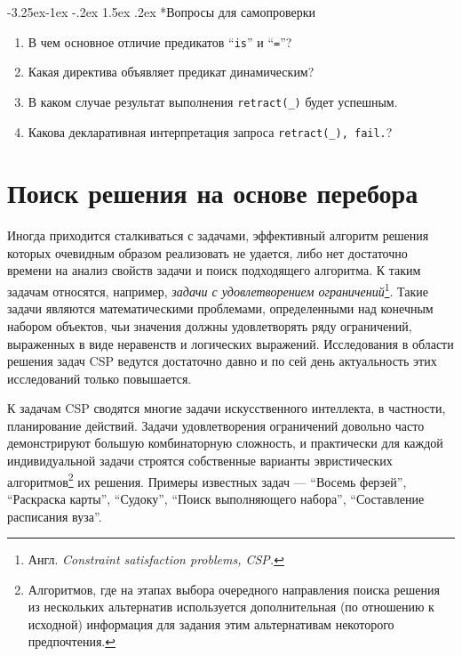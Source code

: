 \documentclass[12pt, openany, twoside]{book} %
\makeatletter
\renewcommand\subsubsection{\@startsection{subsubsection}{3}{\z@}%
                                     {-3.25ex\@plus -1ex \@minus -.2ex}%
                                     {1.5ex \@plus .2ex}%
                                     {\normalfont\normalsize\bfseries}}
\newenvironment{questions}{\subsubsection*{Вопросы для самопроверки}\begin{enumerate}}{\end{enumerate}}
\makeatother
\begin{document}
\begin{questions}
  \item{} В чем основное отличие предикатов ``\texttt{is}'' и ``\texttt{=}''?
  \item{} Какая директива объявляет предикат динамическим?
  \item{} В каком случае результат выполнения \texttt{retract(\_)} будет ус\-пеш\-ным.
  \item{} Какова декларативная интерпретация запроса \texttt{retract(\_), fail.}?
\end{questions}

\chapter{Поиск решения на основе перебора}

Иногда приходится сталкиваться с задачами, эффективный алгоритм решения которых очевидным образом реализовать не удается, либо нет достаточно времени на анализ свойств задачи и поиск подходящего алгоритма. К таким задачам относятся, например, \emph{задачи с удовлетворением ограничений}\footnote{Англ. \emph{Constraint satisfaction problems, CSP.}}. Такие задачи являются математическими проблемами, определенными над конечным набором объектов, чьи значения должны удовлетворять ряду ограничений, выраженных в виде неравенств и логических выражений. Исследования в области решения задач CSP ведутся достаточно давно и по сей день актуальность этих исследований только повышается.

К задачам CSP сводятся многие задачи искусственного интеллекта, в частности, планирование действий. Задачи удовлетворения ограничений довольно часто демонстрируют большую комбинаторную сложность, и практически для каждой индивидуальной задачи строятся собственные варианты эвристических алгоритмов\footnote{Алгоритмов, где на этапах выбора очередного направления поиска решения из нескольких альтернатив используется дополнительная (по отношению к исходной) информация для задания этим альтернативам некоторого предпочтения.} их решения. Примеры известных задач --- ``Восемь ферзей'', ``Раскраска карты'', ``Судоку'', ``Поиск выполняющего набора'', ``Составление расписания вуза''.
\end{document}
